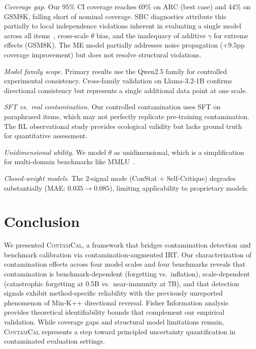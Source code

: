 \documentclass[11pt,a4paper]{article}
\newcommand{\contamcal}{\textsc{ContamCal}}
\begin{document}
\emph{Coverage gap.} Our 95\% CI coverage reaches 69\% on ARC (best case) and 44\% on GSM8K, falling short of nominal coverage. SBC diagnostics attribute this partially to local independence violations inherent in evaluating a single model across all items~\citep{mislevy1986}, cross-scale $\theta$ bias, and the inadequacy of additive $\gamma$ for extreme effects (GSM8K). The ME model partially addresses noise propagation ($+9.5$pp coverage improvement) but does not resolve structural violations.

\emph{Model family scope.} Primary results use the Qwen2.5 family for controlled experimental consistency. Cross-family validation on Llama-3.2-1B confirms directional consistency but represents a single additional data point at one scale.

\emph{SFT vs.\ real contamination.} Our controlled contamination uses SFT on paraphrased items, which may not perfectly replicate pre-training contamination. The RL observational study provides ecological validity but lacks ground truth for quantitative assessment.

\emph{Unidimensional ability.} We model $\theta$ as unidimensional, which is a simplification for multi-domain benchmarks like MMLU~\citep{reckase2009multidimensional, burnell2023multidimensional}.

\emph{Closed-weight models.} The 2-signal mode (ConStat + Self-Critique) degrades substantially (MAE: $0.035 \to 0.085$), limiting applicability to proprietary models.

\section{Conclusion}
\label{sec:conclusion}

We presented \contamcal{}, a framework that bridges contamination detection and benchmark calibration via contamination-augmented IRT. Our characterization of contamination effects across four model scales and four benchmarks reveals that contamination is benchmark-dependent (forgetting vs.\ inflation), scale-dependent (catastrophic forgetting at 0.5B vs.\ near-immunity at 7B), and that detection signals exhibit method-specific reliability with the previously unreported phenomenon of Min-K++ directional reversal. Fisher Information analysis provides theoretical identifiability bounds that complement our empirical validation. While coverage gaps and structural model limitations remain, \contamcal{} represents a step toward principled uncertainty quantification in contaminated evaluation settings.
\end{document}
